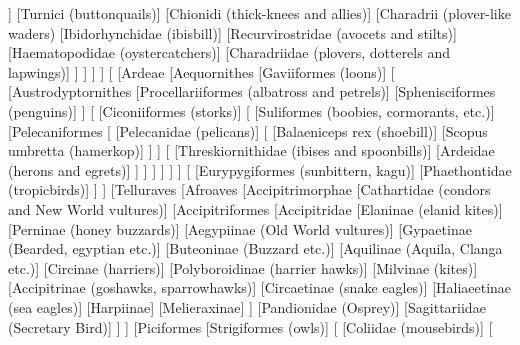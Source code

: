\documentclass[tikz]{standalone}
\begin{document}
\begin{forest}
								[{Lari (gulls and allies)}
									[{Laridae (gulls)}]
									[{Rhynchopidae (skimmers)}]
									[{Sternidae (terns)}]
									[{Alcidae (puffins, guillemots, murres, and allies)}]
									[{Stercorariidae (skuas)}]
									[{Glareolidae (pratincoles and coursers)}]
									[{Pluvianidae (Egyptian plover)}]
									[{Dromadidae (crab plover)}]
								]
								[{Turnici (buttonquails)}]
								[{Chionidi (thick-knees and allies)}]
								[{Charadrii (plover-like waders)}
									[{Ibidorhynchidae (ibisbill)}]
									[{Recurvirostridae (avocets and stilts)}]
									[{Haematopodidae (oystercatchers)}]
									[{Charadriidae (plovers, dotterels and lapwings)}]
								]
							]
		  				]
					]
		       			[
		 				[{Ardeae}
							[{Aequornithes}
								[{Gaviiformes (loons)}]
								[
									[{Austrodyptornithes}
										[{Procellariiformes (albatross and petrels)}]
										[{Sphenisciformes (penguins)}]
									]
									[
										[{Ciconiiformes (storks)}]
										[
											[{Suliformes (boobies, cormorants, etc.)}]
											[{Pelecaniformes}
												[
													[{Pelecanidae (pelicans)}]
													[
														[{Balaeniceps rex (shoebill)}]
														[{Scopus umbretta (hamerkop)}]
													]
												]
												[
													[{Threskiornithidae (ibises and spoonbills)}]
													[{Ardeidae (herons and egrets)}]
												]
											]
										]
									]
								]
							]
			     				[
			     					[{Eurypygiformes (sunbittern, kagu)}]
			      					[{Phaethontidae (tropicbirds)}]
			     				]
						]
			  			[{Telluraves}  
			  				[{Afroaves}
							     	[{Accipitrimorphae}
									[{Cathartidae (condors and New World vultures)}]
								 	[{Accipitriformes}
										[{Accipitridae}
											[{Elaninae (elanid kites)}]
											[{Perninae (honey buzzards)}]
											[{Aegypiinae (Old World vultures)}]
											[{Gypaetinae (Bearded, egyptian etc.)}]
											[{Buteoninae (Buzzard etc.)}]
											[{Aquilinae (Aquila, Clanga etc.)}]
											[{Circinae (harriers)}]
											[{Polyboroidinae (harrier hawks)}]
											[{Milvinae (kites)}]
											[{Accipitrinae (goshawks, sparrowhawks)}]
											[{Circaetinae (snake eagles)}]
											[{Haliaeetinae (sea eagles)}]
											[{Harpiinae}]
											[{Melieraxinae}]
										]
										[{Pandionidae (Osprey)}]
										[{Sagittariidae (Secretary Bird)}]
									]
								]
								[{Piciformes}
									[{Strigiformes (owls)}]
							   		[
							      			[{Coliidae (mousebirds)}]
							      			[

\end{forest}
\end{document}
